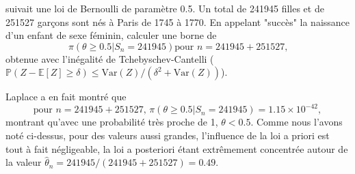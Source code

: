 \documentclass[a4paper,11pt,fleqn]{article}
\newcommand{\1}{\ensuremath{\mathbbm{1}}}
\begin{document}
\begin{enumerate}
suivait une loi de Bernoulli de param\`etre 0.5. Un total de 241945 filles et de 251527 gar\c cons sont n\'es \`a Paris de  1745 \`a 1770.
En appelant "succ\`es" la naissance d'un enfant de sexe f\'eminin, calculer une borne de
$$                                                                                                                                                                                                                                                                                                                             
\,\pi(\theta \geq 0.5 | S_n = 241945 ) \mbox{pour }n = 241945+251527,                                                                                                                                                                                                                                                          
$$
obtenue avec l'in\'egalit\'e de Tchebyschev-Cantelli ($\mathbb{P}(Z-\mathbb{E}[Z]\geq\delta)\leq \mathrm{Var}(Z)/(\delta^2+\mathrm{Var}(Z))$).

Laplace a en fait montr\'e que
\[                                                                                                                                                                                                                                                                                                                             
\mbox{pour }n = 241945+251527,\,\pi(\theta \geq 0.5 | S_n = 241945 ) = 1.15 \times 10^{-42},                                                                                                                                                                                                                                   
\]
montrant qu'avec une probabilit\'e tr\`es proche de 1, $\theta < 0.5$. Comme nous l'avons not\'e ci-dessus,
pour des valeurs aussi grandes, l'influence de la loi a priori est tout \`a fait n\'egligeable, la loi a posteriori
\'etant extr\^emement concentr\'ee autour de la valeur $\hat{\theta}_n = 241 945/ (241 945 + 251 527) = 0.49$.
\end{enumerate}
\end{document}
